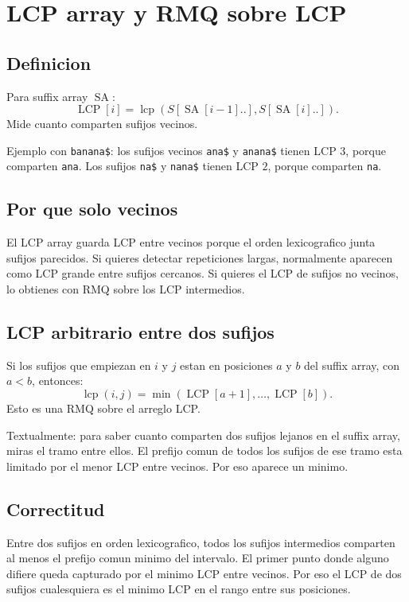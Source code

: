 \documentclass[10pt]{article}
\newcommand{\SA}{\operatorname{SA}}
\newcommand{\LCP}{\operatorname{LCP}}
\begin{document}
\newpage
\section{LCP array y RMQ sobre LCP}

\subsection{Definicion}
Para suffix array $\SA$:
\[
\LCP[i]=\operatorname{lcp}(S[\SA[i-1]..],S[\SA[i]..]).
\]
Mide cuanto comparten sufijos vecinos.

Ejemplo con \texttt{banana\$}: los sufijos vecinos \texttt{ana\$} y
\texttt{anana\$} tienen LCP $3$, porque comparten \texttt{ana}. Los sufijos
\texttt{na\$} y \texttt{nana\$} tienen LCP $2$, porque comparten \texttt{na}.

\subsection{Por que solo vecinos}
El LCP array guarda LCP entre vecinos porque el orden lexicografico junta sufijos
parecidos. Si quieres detectar repeticiones largas, normalmente aparecen como
LCP grande entre sufijos cercanos. Si quieres el LCP de sufijos no vecinos, lo
obtienes con RMQ sobre los LCP intermedios.

\subsection{LCP arbitrario entre dos sufijos}
Si los sufijos que empiezan en $i$ y $j$ estan en posiciones $a$ y $b$ del
suffix array, con $a<b$, entonces:
\[
\operatorname{lcp}(i,j)=\min(\LCP[a+1],\ldots,\LCP[b]).
\]
Esto es una RMQ sobre el arreglo LCP.

Textualmente: para saber cuanto comparten dos sufijos lejanos en el suffix
array, miras el tramo entre ellos. El prefijo comun de todos los sufijos de ese
tramo esta limitado por el menor LCP entre vecinos. Por eso aparece un minimo.

\subsection{Correctitud}
Entre dos sufijos en orden lexicografico, todos los sufijos intermedios comparten
al menos el prefijo comun minimo del intervalo. El primer punto donde alguno
difiere queda capturado por el minimo LCP entre vecinos. Por eso el LCP de dos
sufijos cualesquiera es el minimo LCP en el rango entre sus posiciones.
\end{document}
